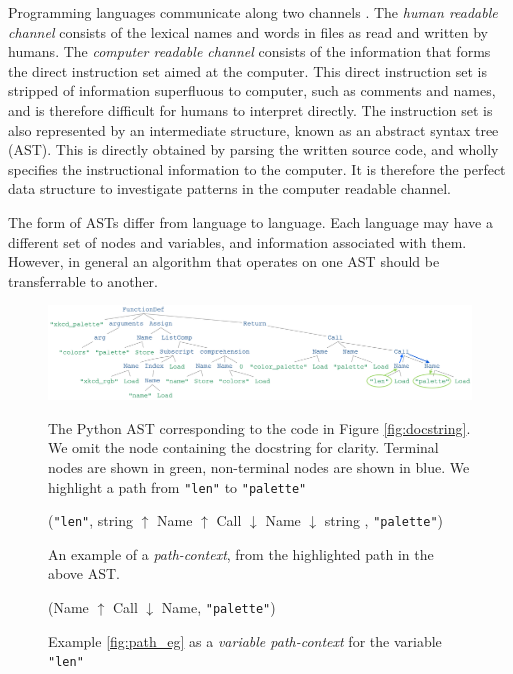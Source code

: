 Programming languages communicate along two channels \citep{allamanis_survey_2017}. The \textit{human readable channel} consists of the lexical names and words in files as read and written by humans.  The \textit{computer readable channel} consists of the information that forms the direct instruction set aimed at the computer.
This direct instruction set is stripped of information superfluous to computer, such as comments and names, and is therefore difficult for humans to interpret directly.
The instruction set is also represented by an intermediate structure, known as an abstract syntax tree (AST).
This is directly obtained by parsing the written source code, and wholly specifies the instructional information to the computer.
It is therefore the perfect data structure to investigate patterns in the computer readable channel.

The form of ASTs differ from language to language. 
Each language may have a different set of nodes and variables, and information associated with them.
However, in general an algorithm that operates on one AST should be transferrable to another. 



\begin{figure}[tb]

    \centering
    \includegraphics[width=\linewidth]{ModelPics/xkcd_palette_strip_full_copy.png}
    \caption{The Python AST corresponding to the code in Figure \ref{fig:docstring}. We omit the node containing the docstring for clarity. Terminal nodes are shown in green, non-terminal nodes are shown in blue. We highlight a path from \texttt{"len"} to  \texttt{"palette"}}
    \label{fig:fullAST}

(\texttt{"len"}, string $\uparrow$ Name $\uparrow$ Call $\downarrow$ Name $\downarrow$ string ,  \texttt{"palette"})
    \caption{An example of a \textit{path-context}, from the highlighted path in the above AST.}
    \label{fig:path_eg}

    (Name $\uparrow$ Call $\downarrow$ Name,  \texttt{"palette"})
    \caption{Example \ref{fig:path_eg} as a \textit{variable path-context} for the variable \texttt{"len"}}
    \label{fig:varpath_eg}
\end{figure}


